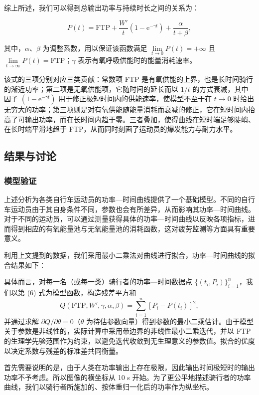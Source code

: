 \documentclass[11pt,a4paper]{ctexart}
\begin{document}
综上所述，我们可以得到总输出功率与持续时长之间的关系为：

\begin{equation}
P(t) = \mathrm{FTP} + \frac{W'}{t}\left(1 - \mathrm{e}^{-\gamma t}\right) + \frac{\alpha}{t + \beta},
\end{equation}

其中，$\alpha$、$\beta$ 为调整系数，用以保证该函数满足 $\lim\limits_{t \to 0} P(t) = +\infty$ 且 $\lim\limits_{t \to \infty} P(t) = \mathrm{FTP}$；$\gamma$ 表示有氧呼吸供能时的能量消耗速率。

该式的三项分别对应三类贡献：常数项 FTP 是有氧供能的上界，也是长时间骑行的渐近功率；第二项是无氧供能项，它随时间的延长而以 $1/t$ 的方式衰减，其中因子 $(1-\mathrm{e}^{-\gamma t})$ 用于修正极短时间内的供能速率，使模型不至于在 $t \to 0$ 时给出无穷大的功率；第三项则是对有氧供能随能量消耗而衰减的修正，它在短时间内抬高了可输出功率，而在长时间内趋于零。三者叠加，使得曲线在短时端足够陡峭、在长时端平滑地趋于 FTP，从而同时刻画了运动员的爆发能力与耐力水平。

\subsection{结果与讨论}

\subsubsection{模型验证}

上述分析为各类自行车运动员的功率—时间曲线提供了一个基础模型。不同的自行车运动员由于其自身条件不同，参数也会有所差异，从而影响其功率—时间曲线。对于不同的运动员，可以通过测量获得具体的功率—时间曲线以反映各项指标，进而得到相应的有氧能量池与无氧能量池的消耗函数，这对疲劳监测等方面具有重要意义。

利用上文提到的数据，我们采用最小二乘法对曲线进行拟合，功率—时间曲线的拟合结果如下：

具体而言，对每一名（或每一类）骑行者的功率—时间数据点 $\{(t_i, P_i)\}_{i=1}^{n}$，我们以第 (6) 式为模型函数，构造残差平方和
\[
Q\left(\mathrm{FTP}, W', \gamma, \alpha, \beta\right) = \sum_{i=1}^{n}\left[P_i - P\left(t_i\right)\right]^2 ,
\]
并通过求解 $\partial Q / \partial \theta = 0$（$\theta$ 为待估参数向量）得到参数的最小二乘估计。由于模型关于参数是非线性的，实际计算中采用带边界的非线性最小二乘迭代，并以 FTP 的生理学先验范围作为约束，以避免迭代收敛到无生理意义的参数值。拟合的优度以决定系数与残差的标准差共同衡量。

首先需要说明的是，由于人类在功率输出上存在极限，因此输出时间极短时的输出功率不予考虑。所以图像的横坐标从 10 s 开始。为了更公平地描述骑行者的功率曲线，我们以骑行者所施加的、按体重归一化后的功率作为纵坐标。
\end{document}
